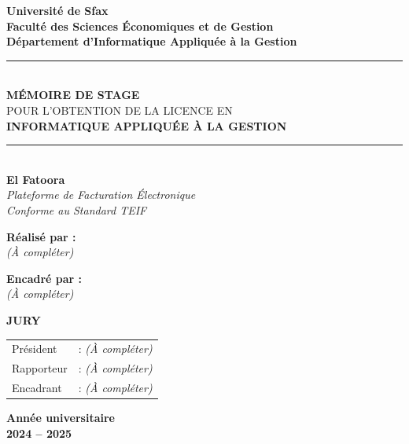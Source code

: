 \documentclass[a4paper,12pt]{report}
\begin{document}
\begin{titlepage}
\begin{center}

\textbf{\large Université de Sfax}\\[4pt]
\textbf{\large Faculté des Sciences Économiques et de Gestion}\\[4pt]
\textbf{Département d'Informatique Appliquée à la Gestion}\\[1.5cm]


\rule{\linewidth}{0.5pt}\\[0.6cm]
{\LARGE \textbf{MÉMOIRE DE STAGE}}\\[0.3cm]
{\large POUR L'OBTENTION DE LA LICENCE EN}\\[0.2cm]
{\large \textbf{INFORMATIQUE APPLIQUÉE À LA GESTION}}\\[0.3cm]
\rule{\linewidth}{0.5pt}\\[1.2cm]

{\Huge \textbf{El Fatoora}}\\[0.5cm]
{\Large \textit{Plateforme de Facturation Électronique\\
Conforme au Standard TEIF}}\\[2cm]

\begin{minipage}[t]{0.45\textwidth}
\begin{flushleft}
\textbf{Réalisé par :}\\[4pt]
\textit{(À compléter)}
\end{flushleft}
\end{minipage}
\hfill
\begin{minipage}[t]{0.45\textwidth}
\begin{flushright}
\textbf{Encadré par :}\\[4pt]
\textit{(À compléter)}
\end{flushright}
\end{minipage}

\vfill

\textbf{JURY}\\[4pt]
\begin{tabular}{l l}
Président   & : \textit{(À compléter)} \\
Rapporteur  & : \textit{(À compléter)} \\
Encadrant   & : \textit{(À compléter)} \\
\end{tabular}

\vfill

\textbf{Année universitaire}\\[4pt]
{\Large \textbf{2024 – 2025}}

\end{center}
\end{titlepage}
\end{document}
